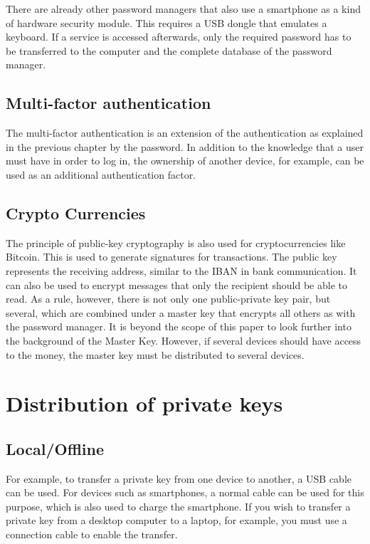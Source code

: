 \documentclass[12pt,oneside,a4paper,parskip]{scrbook}
\begin{document}
There are already other password managers that also use a smartphone as a kind of hardware security module. This requires a USB dongle that emulates a keyboard. If a service is accessed afterwards, only the required password has to be transferred to the computer and the complete database of the password manager. \parencite{noauthor_phraselock_nodate}

\subsection{Multi-factor authentication}
The multi-factor authentication is an extension of the authentication as explained in the previous chapter by the password. In addition to the knowledge that a user must have in order to log in, the ownership of another device, for example, can be used as an additional authentication factor. 

\subsection{Crypto Currencies}
The principle of public-key cryptography is also used for cryptocurrencies like Bitcoin. This is used to generate signatures for transactions. 
The public key represents the receiving address, similar to the IBAN in bank communication. It can also be used to encrypt messages that only the recipient should be able to read. As a rule, however, there is not only one public-private key pair, but several, which are combined under a master key that encrypts all others as with the password manager. It is beyond the scope of this paper to look further into the background of the Master Key. However, if several devices should have access to the money, the master key must be distributed to several devices. \parencite{btcecho_bitcoin_2018}


\section{Distribution of private keys}
\label{sec:distribution}

\subsection{Local/Offline}
For example, to transfer a private key from one device to another, a USB cable can be used. For devices such as smartphones, a normal cable can be used for this purpose, which is also used to charge the smartphone. If you wish to transfer a private key from a desktop computer to a laptop, for example, you must use a connection cable to enable the transfer. \parencite{stiemer_linkkabel_2017}
\end{document}
